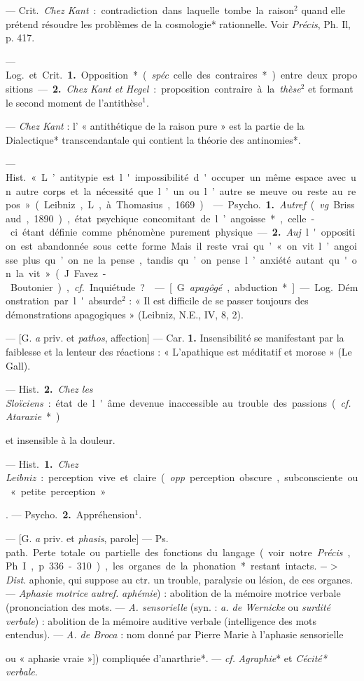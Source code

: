 \begin{itemize}[leftmargin=1cm, label=, itemsep=1pt]
{{{ — \si{Crit.} {\it Chez Kant} : contradiction
dans laquelle tombe la
raison$^2$ quand elle prétend résoudre
les problèmes de la cosmologie*
rationnelle. Voir {\it Précis}, Ph. Il,
p. 417.

 — \si{Log.} et \si{Crit.} {\bf 1.} Opposition*
({\it spéc}. celle des contraires*) entre
deux propositions. — {\bf 2.} {\it Chez Kant
et Hegel} : proposition contraire à la
{\it thèse}$^2$ et formant le second moment
de l’antithèse$^1$.

 — {\it Chez Kant} : l’ « antithétique de la raison pure » est la
partie de la Dialectique* transcendantale qui contient la théorie des
antinomies*.

 — \si{Hist.} « L’antitypie est
l'impossibilité d'occuper un même
espace avec un autre corps et la
nécessité que l’un ou l’autre se
meuve ou reste au repos » (Leibniz,
L, à Thomasius, 1669).

 — \si{Psycho.} {\bf 1.} {\it Autref}. ({\it vg}.
Brissaud, 1890), état psychique
concomitant de l’angoisse*, celle-ci
étant définie comme phénomène
purement physique. — {\bf 2.} {\it Auj}.
l'opposition est abandonnée sous
cette forme. Mais il reste vrai qu’ « on
vit l’angoisse plus qu’on ne la pense,
tandis qu’on pense l’anxiété autant
qu'on la vit » (J. Favez-Boutonier),
{\it cf.}  Inquiétude?.

 — [G. {\it apagôgé}, abduction*]
— \si{Log.} Démonstration par l'absurde$^2$ : « Il est
difficile de se passer toujours des
démonstrations apagogiques » (Leibniz, N.E., IV, 8, 2).

 — [G. {\it a} priv. et {\it pathos}, affection]
— Car. {\bf 1.} Insensibilité se
manifestant par la faiblesse et la
lenteur des réactions : « L’apathique
est méditatif et morose » (Le Gall).

— \si{Hist.} {\bf 2.} {\it Chez les Sloïciens} : état
de l'âme devenue inaccessible au
trouble des passions ({\it cf.}  {\it Ataraxie}*)}
et insensible à la douleur.

 — \si{Hist.} {\bf 1.} {\it Chez Leibniz} :
perception vive et claire ({\it opp}. perception obscure, subconsciente ou
« petite perception »}. — \si{Psycho.}
 {\bf 2.} Appréhension$^1$.

 — [G. {\it a} priv. et {\it phasis}, parole]
— \si{Ps. path.} Perte totale ou partielle des fonctions du langage (voir
notre {\it Précis}, Ph. I, p. 336-310), les
organes de la phonation* restant
intacts. $->$ {\it Dist}. aphonie, qui suppose au ctr. un trouble, paralysie ou
lésion, de ces organes. — {\it Aphasie
motrice} {{\it autref.} {\it aphémie}) : abolition
de la mémoire motrice verbale (prononciation des mots}. — {\it A.
sensorielle} (syn. : {\it a. de Wernicke} ou {\it surdité verbale}) :
abolition de la mémoire
auditive verbale (intelligence des
mots entendus). — {\it A. de Broca} :
nom donné par Pierre Marie à
l'aphasie sensorielle {ou « aphasie
vraie »]) compliquée d’anarthrie*. —
{\it cf.}  {\it Agraphie}* et {\it Cécité* verbale}.

}}
\end{itemize}
